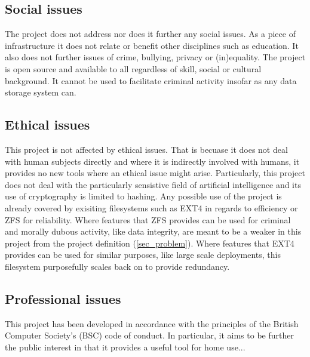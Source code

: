 \begin{appendices}
        \subsection{Social issues}

            The project does not address nor does it further any social issues.
            As a piece of infrastructure it does not relate or benefit other
            disciplines such as education. It also does not further issues of
            crime, bullying, privacy or (in)equality. The project is open
            source and available to all regardless of skill, social or cultural
            background. It cannot be used to facilitate criminal activity
            insofar as any data storage system can.

        \subsection{Ethical issues}

            This project is not affected by ethical issues. That is becuase it
            does not deal with human subjects directly and where it is
            indirectly involved with humans, it provides no new tools where an
            ethical issue might arise. Particularly, this project does not deal
            with the particularly sensistive field of artificial intelligence
            and its use of cryptography is limited to hashing. Any possible use
            of the project is already covered by exisiting filesystems such as
            EXT4 in regards to efficiency or ZFS for reliability. Where
            features that ZFS provides can be used for criminal and morally
            dubous activity, like data integrity, are meant to be a weaker in
            this project from the project definition (\ref{sec_problem}). Where
            features that EXT4 provides can be used for similar purposes, like
            large scale deployments, this filesystem purposefully scales back
            on to provide redundancy.

        \subsection{Professional issues}

            This project has been developed in accordance with the principles
            of the British Computer Society's (BSC) code of conduct. In
            particular, it aims to be further the public interest in that it
            provides a useful tool for home use...



\end{appendices}
